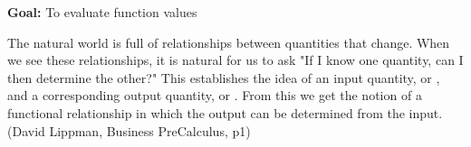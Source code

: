 \documentclass[12pt, twoside]{report}
\begin{document}

\textbf{Goal:} To evaluate function values


The natural world is full of relationships between quantities that change.  When we see these relationships, it is natural for us to ask "If I know one quantity, can I then determine the other?" This establishes the idea of an input quantity, or , and a corresponding output quantity, or . From this we get the notion of a functional relationship in which the output can be determined from the input. 
(David Lippman, Business PreCalculus, p1)

\end{document}
